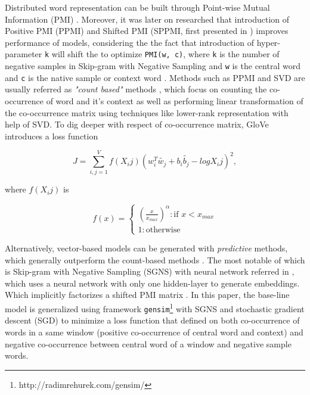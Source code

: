 Distributed word representation can be built through Point-wise Mutual Information (PMI) \cite{church1990word}. Moreover, it was later on researched that introduction of Positive PMI (PPMI) \cite{bullinaria2007extracting} and Shifted PMI (SPPMI, first presented in \cite{goldberg2014word2vec}) improves performance of models, considering the the fact that introduction of hyper-parameter \verb|k| will shift the to optimize \verb|PMI(w, c)|, where \verb|k| is the number of negative samples in Skip-gram with Negative Sampling and \verb|w| is the central word and \verb|c| is the native sample or context word \cite{levy2014neural}. Methods such as PPMI and SVD are usually referred as \emph{"count based"} methods \cite{levy2015improving}, which focus on counting the co-occurrence of word and it's context as well as performing linear transformation of the co-occurrence matrix using techniques like lower-rank representation with help of SVD. To dig deeper with respect of co-occurrence matrix, GloVe \cite{Pennington2014glove} introduces a loss function

\begin{equation}
J=\sum_{i,j=1}^{V}f(X_ij)(w_i^T\tilde{w_j}+b_i\tilde{b_j}-logX_ij)^2,
\end{equation}

where $f(X_ij)$ is

\[f(x)=\begin{cases}
    (\frac{x}{x_{max}})^\alpha : \text{if }x<x_{max}\\
    1 : \text{otherwise}
    \end{cases}
\]

Alternatively, vector-based models can be generated with \emph{predictive} methods, which generally outperform the count-based methods \cite{levy2015improving}. The most notable of which is Skip-gram with Negative Sampling (SGNS) with neural network referred in \cite{mikolov2013distributed}, which uses a neural network with only one hidden-layer to generate embeddings. Which implicitly factorizes a shifted PMI matrix \cite{levy2014neural}. In this paper, the base-line model is generalized using framework \verb|gensim|\footnote{http://radimrehurek.com/gensim/} with SGNS and stochastic gradient descent (SGD) to minimize a loss function that defined on both co-occurrence of words in a same window (positive co-occurrence of central word and context) and negative co-occurrence between central word of a window and negative sample words. 
